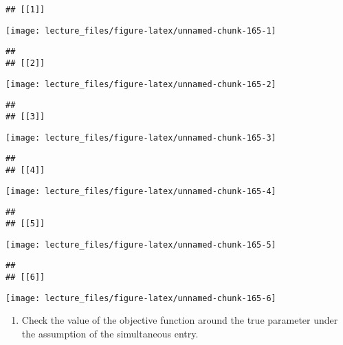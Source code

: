 \documentclass[
]{book}
\providecommand{\tightlist}{%
  \setlength{\itemsep}{0pt}\setlength{\parskip}{0pt}}
\begin{document}
\begin{verbatim}
## [[1]]
\end{verbatim}

\begin{center}\texttt{[image: lecture\_files/figure-latex/unnamed-chunk-165-1]} \end{center}

\begin{verbatim}
## 
## [[2]]
\end{verbatim}

\begin{center}\texttt{[image: lecture\_files/figure-latex/unnamed-chunk-165-2]} \end{center}

\begin{verbatim}
## 
## [[3]]
\end{verbatim}

\begin{center}\texttt{[image: lecture\_files/figure-latex/unnamed-chunk-165-3]} \end{center}

\begin{verbatim}
## 
## [[4]]
\end{verbatim}

\begin{center}\texttt{[image: lecture\_files/figure-latex/unnamed-chunk-165-4]} \end{center}

\begin{verbatim}
## 
## [[5]]
\end{verbatim}

\begin{center}\texttt{[image: lecture\_files/figure-latex/unnamed-chunk-165-5]} \end{center}

\begin{verbatim}
## 
## [[6]]
\end{verbatim}

\begin{center}\texttt{[image: lecture\_files/figure-latex/unnamed-chunk-165-6]} \end{center}

\begin{enumerate}
\def\labelenumi{\arabic{enumi}.}
\setcounter{enumi}{4}
\tightlist
\item
  Check the value of the objective function around the true parameter under the assumption of the simultaneous entry.
\end{enumerate}
\end{document}
